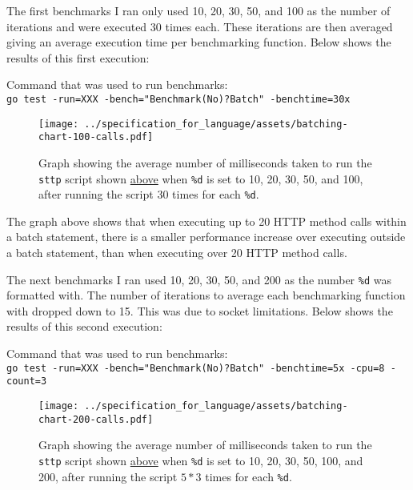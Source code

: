 \label{sec:eval-ast-nodes-batch-bench-1-intro}
The first benchmarks I ran only used 10, 20, 30, 50, and 100 as the number of iterations and were executed 30 times each. These iterations are then averaged giving an average execution time per benchmarking function. Below shows the results of this first execution:

\begin{center}
    Command that was used to run benchmarks:\\[0.5em]
    \verb|go test -run=XXX -bench="Benchmark(No)?Batch" -benchtime=30x|
\end{center}

\begin{figure}[H]
    \centering
    \texttt{[image: ../specification\_for\_language/assets/batching-chart-100-calls.pdf]}
    \cprotect\caption{Graph showing the average number of milliseconds taken to run the \verb|sttp| script shown \hyperref[sec:eval-ast-nodes-batch-bench-snippet]{above} when \verb|%d| is set to 10, 20, 30, 50, and 100, after running the script 30 times for each \verb|%d|.}
    \label{sec:eval-ast-nodes-batch-bench-1-graph}
\end{figure}

The graph above shows that when executing up to 20 HTTP method calls within a batch statement, there is a smaller performance increase over executing outside a batch statement, than when executing over 20 HTTP method calls.

\label{sec:eval-ast-nodes-batch-bench-2-intro}

The next benchmarks I ran used 10, 20, 30, 50, and 200 as the number \verb|%d| was formatted with. The number of iterations to average each benchmarking function with dropped down to 15. This was due to socket limitations. Below shows the results of this second execution:

\begin{center}
    Command that was used to run benchmarks:\\[0.5em]
    \verb|go test -run=XXX -bench="Benchmark(No)?Batch" -benchtime=5x -cpu=8 -count=3|
\end{center}

\begin{figure}[H]
    \centering
    \texttt{[image: ../specification\_for\_language/assets/batching-chart-200-calls.pdf]}
    \cprotect\caption{Graph showing the average number of milliseconds taken to run the \verb|sttp| script shown \hyperref[sec:eval-ast-nodes-batch-bench-snippet]{above} when \verb|%d| is set to 10, 20, 30, 50, 100, and 200, after running the script $5 * 3$ times for each \verb|%d|.}
    \label{sec:eval-ast-nodes-batch-bench-2-graph}
\end{figure}

